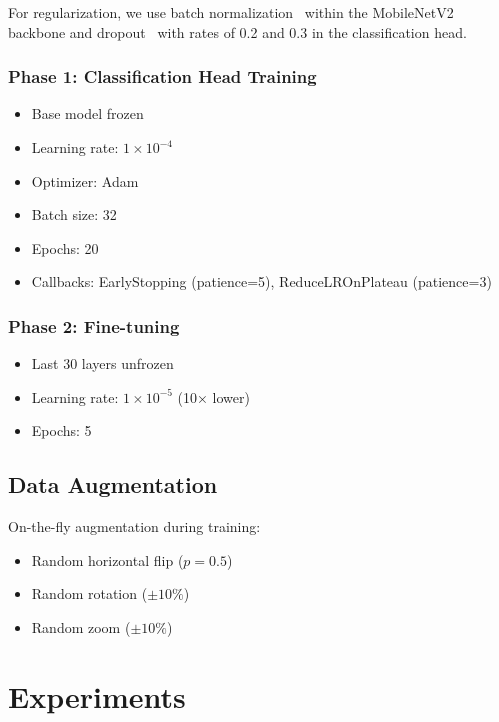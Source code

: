 \documentclass[12pt,a4paper]{article}
\begin{document}
For regularization, we use batch normalization~\cite{ioffe2015batch} 
within the MobileNetV2 backbone and dropout~\cite{srivastava2014dropout} 
with rates of 0.2 and 0.3 in the classification head.

\subsubsection{Phase 1: Classification Head Training}

\begin{itemize}
\item Base model frozen
\item Learning rate: $1 \times 10^{-4}$
\item Optimizer: Adam~\cite{kingma2014adam}
\item Batch size: 32
\item Epochs: 20
\item Callbacks: EarlyStopping (patience=5), ReduceLROnPlateau (patience=3)
\end{itemize}

\subsubsection{Phase 2: Fine-tuning}

\begin{itemize}
\item Last 30 layers unfrozen
\item Learning rate: $1 \times 10^{-5}$ (10× lower)
\item Epochs: 5
\end{itemize}

\subsection{Data Augmentation}

On-the-fly augmentation during training:

\begin{itemize}
\item Random horizontal flip ($p=0.5$)
\item Random rotation ($\pm 10\%$)
\item Random zoom ($\pm 10\%$)
\end{itemize}


\section{Experiments}
\end{document}
